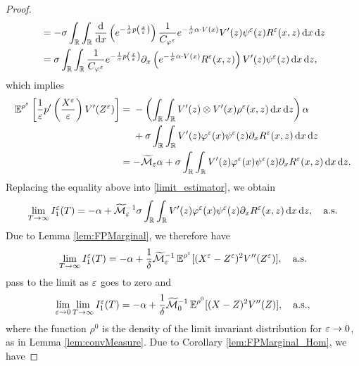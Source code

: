 \documentclass[10pt]{article}
\begin{document}
\begin{proof}
\begin{equation}
\begin{aligned}
	&= -\sigma \int_{\mathbb{R}} \int_{\mathbb{R}} \frac{\mathrm{d}}{\mathrm{d} x}\left( e^{ - \frac{1}{\sigma} p \left ( \frac{x}{\varepsilon} \right)} \right) \frac{1}{C_{\varphi^\varepsilon}} e^{- \frac{1}{\sigma} \alpha \cdot V(x)} V'(z) \psi^\varepsilon(z) R^\varepsilon(x,z) \,\mathrm{d} x \,\mathrm{d} z \\
	&= \sigma \int_{\mathbb{R}} \int_{\mathbb{R}} \frac{1}{C_{\varphi^\varepsilon}} e^{ - \frac{1}{\sigma} p \left ( \frac{x}{\varepsilon} \right)} \partial_x \left ( e^{- \frac{1}{\sigma} \alpha \cdot V(x)} R^\varepsilon(x,z) \right ) V'(z) \psi^\varepsilon(z) \,\mathrm{d} x \,\mathrm{d} z,
\end{aligned}
\end{equation}
which implies
\begin{align}
	\operatorname{\mathbb{E}}^{\rho^\varepsilon} \left [ \frac{1}{\varepsilon} p' \left ( \frac{X^\varepsilon}{\varepsilon} \right ) V'(Z^\varepsilon) \right ] &= 
	\begin{aligned}[t]
		&- \left(\int_{\mathbb{R}} \int_{\mathbb{R}} V'(z) \otimes V'(x) \rho^\varepsilon(x, z) \,\mathrm{d} x \,\mathrm{d} z\right) \alpha \\
		&+\sigma \int_{\mathbb{R}} \int_{\mathbb{R}} V'(z) \varphi^\varepsilon(x) \psi^\varepsilon(z) \partial_x R^\varepsilon(x,z) \,\mathrm{d} x \,\mathrm{d} z 
	\end{aligned}
	\\
	&= - \widetilde {\mathcal M}_\varepsilon\alpha + \sigma \int_{\mathbb{R}} \int_{\mathbb{R}} V'(z) \varphi^\varepsilon(x) \psi^\varepsilon(z) \partial_x R^\varepsilon(x,z) \,\mathrm{d} x \,\mathrm{d} z.
\end{align}
Replacing the equality above into \eqref{limit_estimator}, we obtain
\begin{equation}
\lim_{T \to \infty} I_1^\varepsilon(T) = -\alpha + \widetilde {\mathcal M}_\varepsilon^{-1} \sigma \int_{\mathbb{R}} \int_{\mathbb{R}} V'(z) \varphi^\varepsilon(x) \psi^\varepsilon(z) \partial_x R^\varepsilon(x,z) \,\mathrm{d} x \,\mathrm{d} z, \quad \text{a.s.}
\end{equation}
Due to Lemma \ref{lem:FPMarginal}, we therefore have
\begin{equation} \label{eq:for_zeta}
	\lim_{T \to \infty} I_1^\varepsilon(T) = -\alpha + \frac1\delta \widetilde {\mathcal M}_\varepsilon^{-1} \operatorname{\mathbb{E}}^{\rho^\varepsilon}[(X^\varepsilon - Z^\varepsilon)^2 V''(Z^\varepsilon)], \quad \text{a.s.}	
\end{equation}
 pass to the limit as $\varepsilon$ goes to zero and
\begin{equation} \label{eq:limit_estimator_2}
	\lim_{\varepsilon \to 0} \lim_{T \to \infty} I_1^\varepsilon(T) = -\alpha + \frac1\delta \widetilde {\mathcal M}_0^{-1} \operatorname{\mathbb{E}}^{\rho^0}[(X - Z)^2 V''(Z)], \quad \text{a.s.},
\end{equation}
where the function $\rho^0$ is the density of the limit invariant distribution for $\varepsilon \to 0$, as in Lemma \ref{lem:convMeasure}. Due to Corollary \ref{lem:FPMarginal_Hom}, we have

\end{proof}
\end{document}
